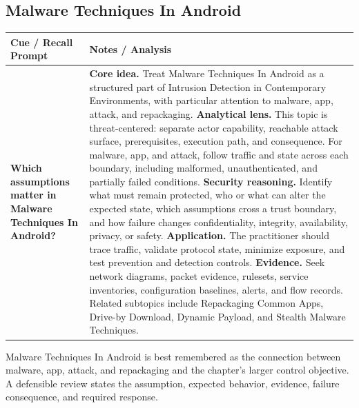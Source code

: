 \documentclass[11pt]{article}
\newcommand{\CornellHeader}{%
\rowcolor{Navy}\color{white}\bfseries Cue / Recall Prompt & \color{white}\bfseries Notes / Analysis\\\hline}
\newcommand{\CornellRow}[2]{%
\cellcolor{CueGray}\RaggedRight\textbf{#1} & \RaggedRight #2\\\hline}
\begin{document}
\subsection*{Malware Techniques In Android}
\begin{longtable}{>{\RaggedRight\arraybackslash}p{}|>{\RaggedRight\arraybackslash}p{}}
\CornellHeader
\CornellRow{Which assumptions matter in Malware Techniques In Android?}{\textbf{Core idea.} Treat Malware Techniques In Android as a structured part of Intrusion Detection in Contemporary Environments, with particular attention to malware, app, attack, and repackaging. \textbf{Analytical lens.} This topic is threat-centered: separate actor capability, reachable attack surface, prerequisites, execution path, and consequence. For malware, app, and attack, follow traffic and state across each boundary, including malformed, unauthenticated, and partially failed conditions. \textbf{Security reasoning.} Identify what must remain protected, who or what can alter the expected state, which assumptions cross a trust boundary, and how failure changes confidentiality, integrity, availability, privacy, or safety. \textbf{Application.} The practitioner should trace traffic, validate protocol state, minimize exposure, and test prevention and detection controls. \textbf{Evidence.} Seek network diagrams, packet evidence, rulesets, service inventories, configuration baselines, alerts, and flow records. Related subtopics include Repackaging Common Apps, Drive-by Download, Dynamic Payload, and Stealth Malware Techniques.}
\end{longtable}
\begin{topicsummary}
Malware Techniques In Android is best remembered as the connection between malware, app, attack, and repackaging and the chapter's larger control objective. A defensible review states the assumption, expected behavior, evidence, failure consequence, and required response.
\end{topicsummary}
\end{document}
